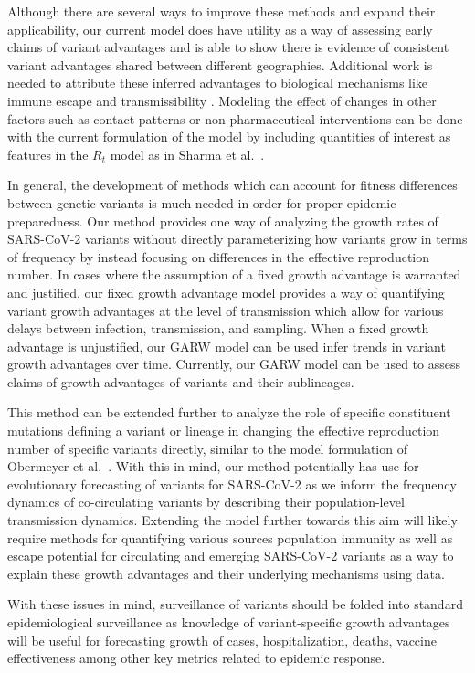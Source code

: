 \documentclass[11pt,oneside,letterpaper]{article}
\begin{document}
Although there are several ways to improve these methods and expand their applicability, our current model does have utility as a way of assessing early claims of variant advantages and is able to show there is evidence of consistent variant advantages shared between different geographies.
Additional work is needed to attribute these inferred advantages to biological mechanisms like immune escape and transmissibility \cite{tao2021biological}.
Modeling the effect of changes in other factors such as contact patterns or non-pharmaceutical interventions can be done with the current formulation of the model by including quantities of interest as features in the $R_{t}$ model as in Sharma et al.\ \cite{Sharma2021}.

In general, the development of methods which can account for fitness differences between genetic variants is much needed in order for proper epidemic preparedness.
Our method provides one way of analyzing the growth rates of SARS-CoV-2 variants without directly parameterizing how variants grow in terms of frequency by instead focusing on differences in the effective reproduction number.
In cases where the assumption of a fixed growth advantage is warranted and justified, our fixed growth advantage model provides a way of quantifying variant growth advantages at the level of transmission which allow for various delays between infection, transmission, and sampling.
When a fixed growth advantage is unjustified, our GARW model can be used infer trends in variant growth advantages over time.
Currently, our GARW model can be used to assess claims of growth advantages of variants and their sublineages.

This method can be extended further to analyze the role of specific constituent mutations defining a variant or lineage in changing the effective reproduction number of specific variants directly, similar to the model formulation of Obermeyer et al.\ \cite{Obermeyer2021}.
With this in mind, our method potentially has use for evolutionary forecasting of variants for SARS-CoV-2 as we inform the frequency dynamics of co-circulating variants by describing their population-level transmission dynamics.
Extending the model further towards this aim will likely require methods for quantifying various sources population immunity as well as escape potential for circulating and emerging SARS-CoV-2 variants as a way to explain these growth advantages and their underlying mechanisms using data.

With these issues in mind, surveillance of variants should be folded into standard epidemiological surveillance as knowledge of variant-specific growth advantages will be useful for forecasting growth of cases, hospitalization, deaths, vaccine effectiveness among other key metrics related to epidemic response.
\end{document}

